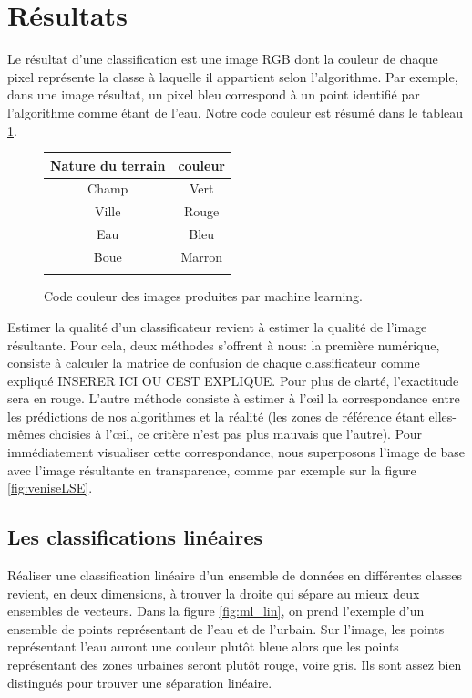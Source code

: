 \documentclass[a4paper,10pt]{report}
\begin{document}
\section{Résultats}
Le résultat d'une classification est une image RGB dont la couleur de chaque pixel représente la classe à laquelle il appartient selon l'algorithme. Par exemple, dans une image résultat, un pixel bleu correspond à un point identifié par l'algorithme comme étant de l'eau. Notre code couleur est résumé dans le tableau \ref{table:codeCouleur}.
\begin{figure}[H]
 \begin{center}
  \begin{tabular}{|c|c|}
    \hline
    Nature du terrain & couleur \\
    \hline
  Champ & Vert \\
  Ville &  Rouge \\
  Eau &  Bleu \\
  Boue & Marron \\
    \hline
  \label{table:codeCouleur}
  \end{tabular}
\caption{Code couleur des images produites par machine learning.} 
\end{center}
\end{figure}
Estimer la qualité d'un classificateur revient à estimer la qualité de l'image résultante. Pour cela, deux méthodes s'offrent à nous: la première numérique, consiste à calculer la matrice de confusion de chaque classificateur comme expliqué INSERER ICI OU CEST EXPLIQUE. Pour plus de clarté, l'exactitude sera en rouge. L'autre méthode consiste à estimer à l'œil la correspondance entre les prédictions de nos algorithmes et la réalité (les zones de référence étant elles-mêmes choisies à l'œil, ce critère n'est pas plus mauvais que l'autre). Pour immédiatement visualiser cette correspondance, nous superposons l'image de base avec l'image résultante en transparence, comme par exemple sur la figure \ref{fig:veniseLSE}.

 \subsection{Les classifications linéaires}
 
 Réaliser une classification linéaire d'un ensemble de données en différentes classes revient, en deux dimensions, à trouver la droite qui sépare au mieux deux ensembles de vecteurs. Dans la figure \ref{fig:ml_lin}, on prend l'exemple d'un ensemble de points représentant de l'eau et de l'urbain. Sur l'image, les points représentant l'eau auront une couleur plutôt bleue alors que les points représentant des zones urbaines seront plutôt rouge, voire gris. Ils sont assez bien distingués pour trouver une séparation linéaire.
\end{document}
